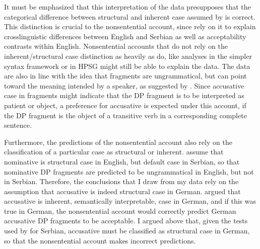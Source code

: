 It must be emphasized that this interpretation of the data presupposes that the categorical difference between structural and inherent case assumed by \citet{barton.progovac2005} is correct. This distinction is crucial to the nonsentential account, since \citet{barton.progovac2005} rely on it to explain crosslinguistic differences between English and Serbian as well as acceptability contrasts within English. Nonsentential accounts that do not rely on the inherent/structural case distinction as heavily as \citet{barton.progovac2005} do, like analyses in the simpler syntax framework \citep{culicover.jackendoff2005} or in HPSG \citep{ginzburg.sag2000, fernandez.ginzburg2002} might still be able to explain the data. The data are also in line with the idea that fragments are ungrammatical, but can point toward the meaning intended by a speaker, as suggested by \citet{bergen.goodman2015}. Since accusative case in fragments might indicate that the DP fragment is to be interpreted as patient or object, a preference for accusative is expected under this account, if the DP fragment is the object of a transitive verb in a corresponding complete sentence. 

Furthermore, the predictions of the nonsentential account also rely on the classification of a particular case as structural or inherent. \citet{barton.progovac2005} assume that nominative is structural case in English, but default case in Serbian, so that nominative DP fragments are predicted to be ungrammatical in English, but not in Serbian. Therefore, the conclusions that I draw from my data rely on the assumption that accusative is indeed structural case in German. \citet{progovac.etal2006} argued that accusative is inherent, semantically interpretable, case in German, and if this was true in German, the nonsentential account would correctly predict German accusative DP fragments to be acceptable. I argued above that, given the tests used by \citet{progovac.etal2006} for Serbian, accusative must be classified as structural case in German, so that the nonsentential account makes incorrect predictions. 

